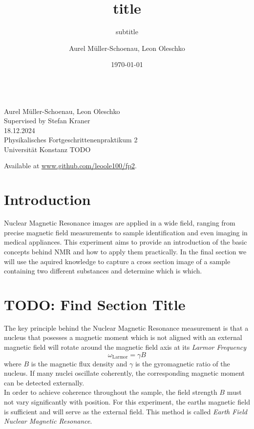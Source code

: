 \documentclass[
    parskip=half, 
    twoside=false,
    twocolumn=true,
    fontsize=11pt,
]{scrarticle}
\begin{document}
\title{title}
\subtitle{subtitle}
\author{Aurel Müller-Schoenau, Leon Oleschko}
\date{\dotdate\today}


\begin{titlepage}
    \sffamily
    \vspace*{3cm}
    {
        \fontsize{32}{32}
    }
    \vspace{.25cm}\\
    {
        \Large
        Aurel Müller-Schoenau, Leon Oleschko\\
        Supervised by Stefan Kraner
        \vspace{.05cm}\\
        18.12.2024
        \vspace{.25cm}\\
        \normalsize
        Physikalisches Fortgeschrittenenpraktikum 2\\
        Universität Konstanz
    }
    \vfill
    {
        \normalfont\normalsize 
        TODO
    }
    \vfill
    \begin{flushright}
        Available at \url{www.github.com/leoole100/fp2}.
    \end{flushright}
\end{titlepage}

\section{Introduction}

Nuclear Magnetic Resonance images are applied in a wide field, ranging from precise magnetic field measurements to sample identification and even imaging in medical appliances. This experiment aims to provide an introduction of the basic concepts behind NMR and how to apply them practically. In the final section we will use the aquired knowledge to capture a cross section image of a sample containing two different substances and determine which is which.

\section{TODO: Find Section Title}

The key principle behind the Nuclear Magnetic Resonance measurement is that a nucleus that posesses a magnetic moment which is not aligned with an external magnetic field will rotate around the magnetic field axis at its \textit{Larmor Frequency}
\begin{equation}
\label{eq:larmor_frequency}
 \omega_\text{Larmor} = \gamma B
\end{equation}
where $B$ is the magnetic flux density and $\gamma$ is the gyromagnetic ratio of the nucleus. If many nuclei oscillate coherently, the corresponding magnetic moment can be detected externally.\\
In order to achieve coherence throughout the sample, the field strength $B$ must not vary significantly with position. For this experiment, the earths magnetic field is sufficient and will serve as the external field. This method is called \textit{Earth Field Nuclear Magnetic Resonance}.
\end{document}
